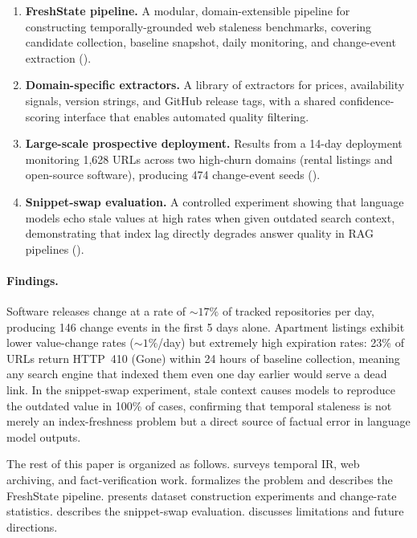 \begin{enumerate}
  \item \textbf{FreshState pipeline.} A modular, domain-extensible pipeline for
        constructing temporally-grounded web staleness benchmarks, covering candidate
        collection, baseline snapshot, daily monitoring, and change-event extraction
        ().

  \item \textbf{Domain-specific extractors.} A library of extractors for prices,
        availability signals, version strings, and GitHub release tags, with a shared
        confidence-scoring interface that enables automated quality filtering.

  \item \textbf{Large-scale prospective deployment.} Results from a 14-day deployment
        monitoring 1,628 URLs across two high-churn domains (rental listings and
        open-source software), producing 474 change-event seeds
        ().

  \item \textbf{Snippet-swap evaluation.} A controlled experiment showing that
        language models echo stale values at high rates when given outdated search
        context, demonstrating that index lag directly degrades answer quality in
        RAG pipelines ().
\end{enumerate}

\paragraph{Findings.} Software releases change at a rate of ${\sim}17\%$ of tracked
repositories per day, producing 146 change events in the first 5 days alone.
Apartment listings exhibit lower value-change rates (${\sim}1\%$/day) but extremely
high expiration rates: 23\% of URLs return HTTP~410 (Gone) within 24 hours of
baseline collection, meaning any search engine that indexed them even one day earlier
would serve a dead link. In the snippet-swap experiment, stale context causes models
to reproduce the outdated value in 100\% of cases, confirming that
temporal staleness is not merely an index-freshness problem but a direct source of
factual error in language model outputs.

The rest of this paper is organized as follows.  surveys temporal
IR, web archiving, and fact-verification work.  formalizes the
problem and describes the FreshState pipeline.  presents
dataset construction experiments and change-rate statistics. 
describes the snippet-swap evaluation.  discusses limitations
and future directions.
